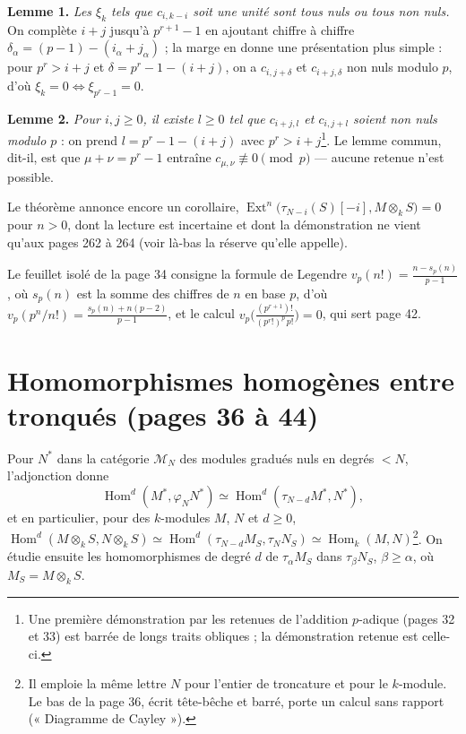 \documentclass[11pt,a4paper]{article}
\begin{document}
\textbf{Lemme 1.} \emph{Les $\xi_k$ tels que $c_{i,k-i}$ soit une unité sont
tous nuls ou tous non nuls.} On complète $i + j$ jusqu'à $p^{r+1} - 1$ en
ajoutant chiffre à chiffre $\delta_\alpha = (p-1) - (i_\alpha + j_\alpha)$ ; la
marge en donne une présentation plus simple : pour $p^r > i+j$ et $\delta =
p^r - 1 - (i+j)$, on a $c_{i, j+\delta}$ et $c_{i+j, \delta}$ non nuls modulo
$p$, d'où $\xi_k = 0 \iff \xi_{p^r - 1} = 0$.

\textbf{Lemme 2.} \emph{Pour $i, j \geq 0$, il existe $l \geq 0$ tel que
$c_{i+j,l}$ et $c_{i,j+l}$ soient non nuls modulo $p$} : on prend $l = p^r - 1 -
(i+j)$ avec $p^r > i+j$\footnote{Une première démonstration par les retenues
de l'addition $p$-adique (pages 32 et 33) est barrée de longs traits obliques ;
la démonstration retenue est celle-ci.}. Le lemme commun, dit-il, est que
$\mu + \nu = p^r - 1$ entraîne $c_{\mu,\nu} \not\equiv 0 \pmod p$ — aucune
retenue n'est possible.

Le théorème annonce encore un corollaire, $\operatorname{Ext}^n\bigl(
\tau_{N-i}(S)[-i], M \otimes_k S\bigr) = 0$ pour $n > 0$, dont la lecture est
incertaine et dont la démonstration ne vient qu'aux pages 262 à 264 (voir
là-bas la réserve qu'elle appelle).

Le feuillet isolé de la page 34 consigne la formule de Legendre
$v_p(n!) = \frac{n - s_p(n)}{p-1}$, où $s_p(n)$ est la somme des chiffres de $n$
en base $p$, d'où $v_p(p^n/n!) = \frac{s_p(n) + n(p-2)}{p-1}$, et le calcul
$v_p\bigl(\frac{(p^{r+1})!}{(p^r!)^p\, p!}\bigr) = 0$, qui sert page 42.

\section*{Homomorphismes homogènes entre tronqués (pages 36 à 44)}

Pour $N^*$ dans la catégorie $\mathcal{M}_N$ des modules gradués nuls en
degrés $< N$, l'adjonction donne
\[
\operatorname{Hom}^d(M^*, \varphi_N N^*) \simeq \operatorname{Hom}^d(\tau_{N-d} M^*, N^*) ,
\]
et en particulier, pour des $k$-modules $M$, $N$ et $d \geq 0$,
$\operatorname{Hom}^d(M \otimes_k S, N \otimes_k S) \simeq
\operatorname{Hom}^d(\tau_{N-d} M_S, \tau_N N_S) \simeq \operatorname{Hom}_k(M,
N)$\footnote{Il emploie la même lettre $N$ pour l'entier de troncature et pour
le $k$-module. Le bas de la page 36, écrit tête-bêche et barré, porte un calcul
sans rapport (« Diagramme de Cayley »).}. On étudie ensuite les homomorphismes
de degré $d$ de $\tau_\alpha M_S$ dans $\tau_\beta N_S$, $\beta \geq \alpha$,
où $M_S = M \otimes_k S$.
\end{document}
